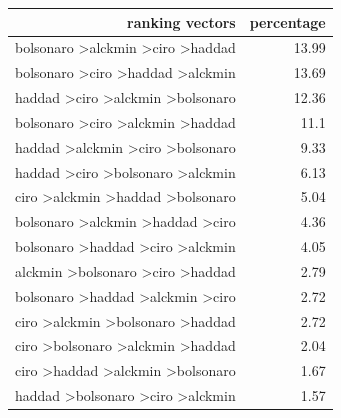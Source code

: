 \documentclass[hidelinks,11pt]{article}
\begin{document}
\begin{table}[H]
  \centering
\begin{tabular}{|r|r|}
\hline
\textbf{ranking vectors}                           & \textbf{percentage} \\ \hline
bolsonaro \textgreater alckmin \textgreater ciro \textgreater haddad & 13.99                                \\ \hline
bolsonaro \textgreater ciro \textgreater haddad \textgreater alckmin & 13.69                                \\ \hline
haddad \textgreater ciro \textgreater alckmin \textgreater bolsonaro & 12.36                                \\ \hline
bolsonaro \textgreater ciro \textgreater alckmin \textgreater haddad & 11.1                                 \\ \hline
haddad \textgreater alckmin \textgreater ciro \textgreater bolsonaro & 9.33                                 \\ \hline
haddad \textgreater ciro \textgreater bolsonaro \textgreater alckmin & 6.13                                 \\ \hline
ciro \textgreater alckmin \textgreater haddad \textgreater bolsonaro & 5.04                                 \\ \hline
bolsonaro \textgreater alckmin \textgreater haddad \textgreater ciro & 4.36                                 \\ \hline
bolsonaro \textgreater haddad \textgreater ciro \textgreater alckmin & 4.05                                 \\ \hline
alckmin \textgreater bolsonaro \textgreater ciro \textgreater haddad & 2.79                                 \\ \hline
bolsonaro \textgreater haddad \textgreater alckmin \textgreater ciro & 2.72                                 \\ \hline
ciro \textgreater alckmin \textgreater bolsonaro \textgreater haddad & 2.72                                 \\ \hline
ciro \textgreater bolsonaro \textgreater alckmin \textgreater haddad & 2.04                                 \\ \hline
ciro \textgreater haddad \textgreater alckmin \textgreater bolsonaro & 1.67                                 \\ \hline
haddad \textgreater bolsonaro \textgreater ciro \textgreater alckmin & 1.57                                 \\ \hline

\end{tabular}
\end{table}
\end{document}
